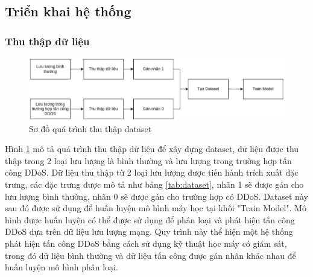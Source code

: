 \documentclass[a4paper]{article}
\begin{document}
\subsection{Triển khai hệ thống}
\subsubsection{Thu thập dữ liệu}
\begin{figure}
    \centering
    \includegraphics[width=1\linewidth]{images//result/collect_dataset.png}
    \caption{Sơ đồ quá trình thu thập dataset}
    \label{fig:collect_dataset}
\end{figure}

Hình \ref{fig:collect_dataset} mô tả quá trình thu thập dữ liệu để xây dựng dataset, dữ liệu được thu thập trong 2 loại lưu lượng  là bình thường và lưu lượng trong trường hợp tấn công DDoS. Dữ liệu thu thập từ 2 loại lưu lượng được tiến hành trích xuất đặc trưng, các đặc trưng được mô tả như bảng \ref{tab:dataset}, nhãn 1 sẽ được gán cho lưu lượng bình thường, nhãn 0 sẽ được gán cho trường hợp có DDoS. Dataset này sau đó được sử dụng để huấn luyện mô hình máy học tại khối "Train Model". Mô hình được huấn luyện có thể được sử dụng để phân loại và phát hiện tấn công DDoS dựa trên dữ liệu lưu lượng mạng. Quy trình này thể hiện một hệ thống phát hiện tấn công DDoS bằng cách sử dụng kỹ thuật học máy có giám sát, trong đó dữ liệu bình thường và dữ liệu tấn công được gán nhãn khác nhau để huấn luyện mô hình phân loại.
\end{document}
